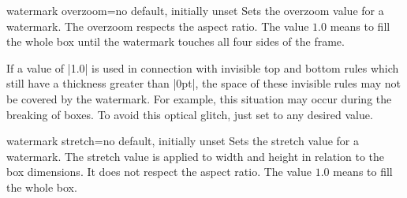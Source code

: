 \begin{docTcbKey}{watermark overzoom}{=}{no default, initially unset}
Sets the overzoom value for a watermark. The overzoom respects the aspect ratio.
The value $1.0$ means to fill the whole box until the watermark touches
all four sides of the frame.
\begin{dispExample}

\begin{tcolorbox}[title=Zoom 1.0,watermark zoom=1.0]
\lipsum[1]
\end{tcolorbox}\hfill%
\begin{tcolorbox}[title=Overzoom 1.0,watermark overzoom=1.0]
\lipsum[1]
\end{tcolorbox}%
\end{dispExample}
\end{docTcbKey}

\begin{marker}
If a  value of |1.0| is used in connection
with invisible top and bottom rules which still have a thickness greater than |0pt|,
the space of these invisible rules may not be covered by the watermark.
For example, this situation may occur during the breaking of  boxes.
To avoid this optical glitch, just set  to any desired value.
\end{marker}

\begin{docTcbKey}{watermark stretch}{=}{no default, initially unset}
Sets the stretch value for a watermark. The stretch value is applied to width
and height in relation to the box dimensions. It does not respect the aspect ratio.
The value $1.0$ means to fill the whole box.
\begin{dispExample}

\begin{tcolorbox}[title=Stretch 1.00,watermark stretch=1.00]
\lipsum[2]
\end{tcolorbox}\hfill%
\begin{tcolorbox}[title=Stretch 0.50,watermark stretch=0.50]
\lipsum[2]
\end{tcolorbox}%
\end{dispExample}
\end{docTcbKey}

